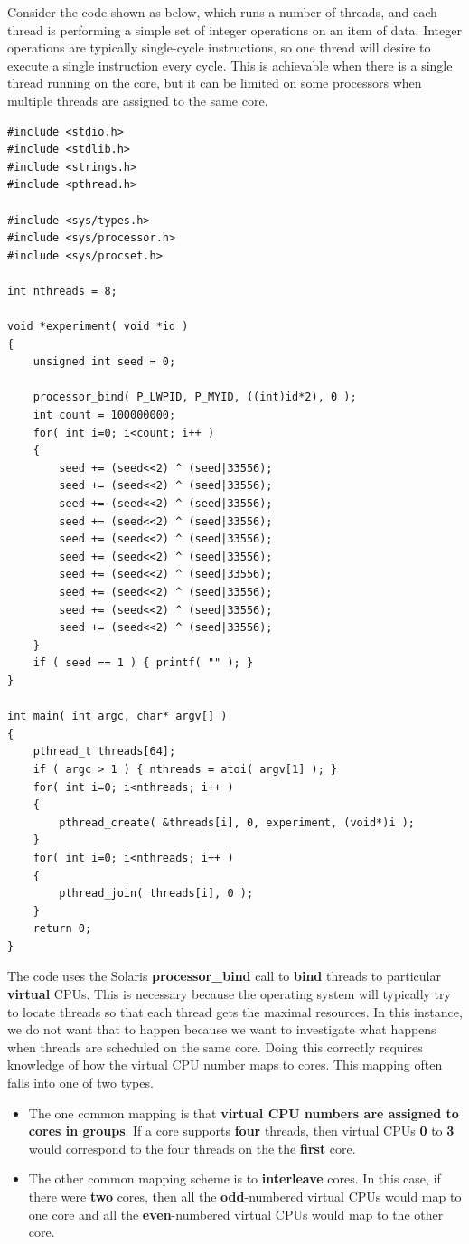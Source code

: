 \documentclass[12pt,a4paper]{report}
\begin{document}
\par
Consider the code shown as below, which runs a number of threads, and each thread is performing a simple set of integer operations on an item of data. Integer operations are typically single-cycle instructions, so one thread will desire to execute a single instruction every cycle. This is achievable when there is a single thread running on the core, but it can be limited on some processors when multiple threads are assigned to the same core.
\begin{lstlisting}
#include <stdio.h>
#include <stdlib.h>
#include <strings.h>
#include <pthread.h>

#include <sys/types.h>
#include <sys/processor.h>
#include <sys/procset.h>

int nthreads = 8;

void *experiment( void *id )
{
	unsigned int seed = 0;
	
	processor_bind( P_LWPID, P_MYID, ((int)id*2), 0 );
	int count = 100000000;
	for( int i=0; i<count; i++ )
	{
		seed += (seed<<2) ^ (seed|33556);
		seed += (seed<<2) ^ (seed|33556);
		seed += (seed<<2) ^ (seed|33556);
		seed += (seed<<2) ^ (seed|33556);
		seed += (seed<<2) ^ (seed|33556);
		seed += (seed<<2) ^ (seed|33556);
		seed += (seed<<2) ^ (seed|33556);
		seed += (seed<<2) ^ (seed|33556);
		seed += (seed<<2) ^ (seed|33556);
		seed += (seed<<2) ^ (seed|33556);
	}
	if ( seed == 1 ) { printf( "" ); }
}

int main( int argc, char* argv[] )
{
	pthread_t threads[64];
	if ( argc > 1 ) { nthreads = atoi( argv[1] ); }
	for( int i=0; i<nthreads; i++ )
	{
		pthread_create( &threads[i], 0, experiment, (void*)i );
	}
	for( int i=0; i<nthreads; i++ )
	{
		pthread_join( threads[i], 0 );
	}
	return 0;
}

\end{lstlisting}
The code uses the Solaris \textbf{processor\_bind} call to \textbf{bind} threads to particular \textbf{virtual} CPUs. This is necessary because the operating system will typically try to locate threads so that each thread gets the maximal resources. In this instance, we do not want that to happen because we want to investigate what happens when threads are scheduled on the same core. Doing this correctly requires knowledge of how the virtual CPU number maps to cores. This mapping often falls into one of two types.
\begin{itemize}
	\item The one common mapping is that \textbf{virtual CPU numbers are assigned to cores in groups}. If a core supports \textbf{four} threads, then virtual CPUs \textbf{0} to \textbf{3} would correspond to the four threads on the the \textbf{first} core.
	\item 	The other common mapping scheme is to \textbf{interleave} cores. In this case, if there were \textbf{two} cores, then all the \textbf{odd}-numbered virtual CPUs would map to one core and all the \textbf{even}-numbered virtual CPUs would map to the other core.
\end{itemize}
\end{document}
